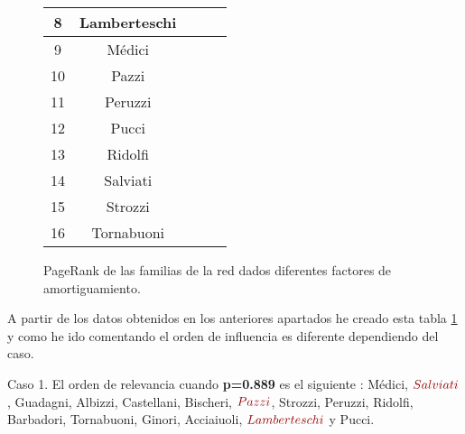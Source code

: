 \begin{figure}[H]
\begin{tabular}{|c|c|c|c|c|}
        8 & Lamberteschi & \cellcolor{orange!25}{0.03579468921457365} & \cellcolor{orange!25}{0.02876476367779198} & \cellcolor{orange!25}{0.026786980661079315} \\ \hline
        9 & Médici & \cellcolor{green!25}{0.1320795678121636} & \cellcolor{green!25}{0.14622904976114215} & \cellcolor{green!25}{0.15000147486369722} \\ \hline
        10 & Pazzi & \cellcolor{violet!25}{0.06254850473182186} & \cellcolor{violet!25}{0.06830356213169397} & \cellcolor{violet!25}{0.07062222025284678} \\ \hline
        11 & Peruzzi & \cellcolor{violet!25}{0.0640338188350678} & \cellcolor{violet!25}{0.06509509970488973} & \cellcolor{violet!25}{0.06531503351579934} \\ \hline
        12 & Pucci & \cellcolor{red!25}{0.02031219384756239} & \cellcolor{red!25}{0.00990099009900966} & \cellcolor{red!25}{0.007345642247369766} \\ \hline
        13 & Ridolfi & \cellcolor{yellow!25}{0.05813785531252352} & \cellcolor{yellow!25}{0.05766828706625104} & \cellcolor{yellow!25}{0.05753848456033725} \\ \hline
        14 & Salviati & \cellcolor{blue!25}{0.07857525064488464} & \cellcolor{blue!25}{0.08867479996044474} & \cellcolor{blue!25}{0.09235401457779774} \\ \hline
        15 & Strozzi & \cellcolor{violet!25}{0.06601505333490647} & \cellcolor{violet!25}{0.06716243109855179} & \cellcolor{violet!25}{0.0673885084397732} \\ \hline
        16 & Tornabuoni & \cellcolor{yellow!25}{0.04914701665134973} & \cellcolor{yellow!25}{0.04510411167989654} & \cellcolor{yellow!25}{0.04383755158579216}\\ \hline
    \end{tabular}
    \caption{PageRank de las familias de la red dados diferentes factores de amortiguamiento.}
    \label{fig:pageRankFamilias-4}
\end{figure}
\par A partir de los datos obtenidos en los anteriores apartados he creado esta tabla \ref{fig:pageRankFamilias-4} 
y como he ido comentando el orden de influencia es diferente dependiendo del caso.

\par Caso 1. El orden de relevancia cuando \textbf{p=0.889} es el siguiente : Médici, $\color{rojoOscuro}{Salviati}$, Guadagni, Albizzi, Castellani, Bischeri, $\color{rojoOscuro}{Pazzi}$, Strozzi, Peruzzi,
Ridolfi, Barbadori, Tornabuoni, Ginori, Acciaiuoli, $\color{rojoOscuro}{Lamberteschi}$ y Pucci.

